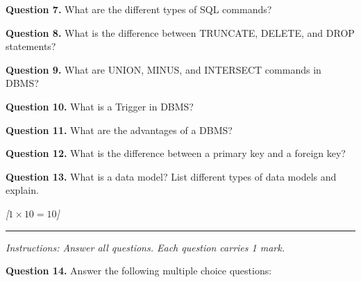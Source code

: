 \documentclass[11pt,a4paper]{article}
\newcommand{\pts}[1]{\hfill   \textit{[#1]}}
\begin{document}
\medskip


\noindent   \textbf{Question 7.} What are the different types of SQL commands?

\medskip


\noindent   \textbf{Question 8.} What is the difference between TRUNCATE, DELETE, and DROP statements?

\medskip


\noindent   \textbf{Question 9.} What are UNION, MINUS, and INTERSECT commands in DBMS?

\medskip


\noindent   \textbf{Question 10.} What is a Trigger in DBMS?

\medskip


\noindent   \textbf{Question 11.} What are the advantages of a DBMS?

\medskip


\noindent   \textbf{Question 12.} What is the difference between a primary key and a foreign key?

\medskip


\noindent   \textbf{Question 13.} What is a data model? List different types of data models and explain.

\bigskip


\pts{$1  \times 10 = 10$}
\rule{\linewidth}{0.4pt}\smallskip




\noindent   \textit{Instructions: Answer all questions. Each question carries 1 mark.}

\medskip


\noindent   \textbf{Question 14.} Answer the following multiple choice questions:
\end{document}
